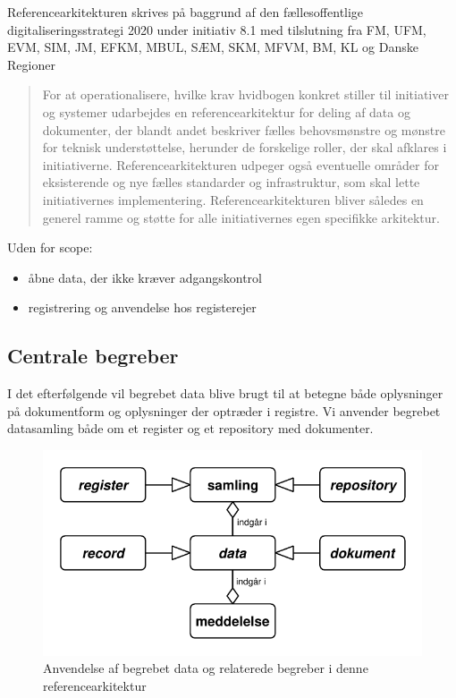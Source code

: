 Referencearkitekturen skrives på baggrund af den fællesoffentlige
digitaliseringsstrategi 2020 under initiativ 8.1 med tilslutning fra FM,
UFM, EVM, SIM, JM, EFKM, MBUL, SÆM, SKM, MFVM, BM, KL og Danske Regioner

\begin{quote}
For at operationalisere, hvilke krav hvidbogen konkret stiller til
initiativer og systemer udarbejdes en referencearkitektur for deling af
data og dokumenter, der blandt andet beskriver fælles behovsmønstre og
mønstre for teknisk understøttelse, herunder de forskelige roller, der
skal afklares i initiativerne. Referencearkitekturen udpeger også
eventuelle områder for eksisterende og nye fælles standarder og
infrastruktur, som skal lette initiativernes implementering.
Referencearkitekturen bliver således en generel ramme og støtte for alle
initiativernes egen specifikke arkitektur.
\end{quote}

Uden for scope:

\begin{itemize}
\tightlist
\item
  åbne data, der ikke kræver adgangskontrol
\item
  registrering og anvendelse hos registerejer
\end{itemize}

\subsection{Centrale begreber}\label{centrale-begreber}

I det efterfølgende vil begrebet data blive brugt til at betegne både
oplysninger på dokumentform og oplysninger der optræder i registre. Vi
anvender begrebet datasamling både om et register og et repository med
dokumenter.

\begin{figure}
\centering
\includegraphics{abstraktion.pdf}
\caption{Anvendelse af begrebet data og relaterede begreber i denne
referencearkitektur}
\end{figure}

